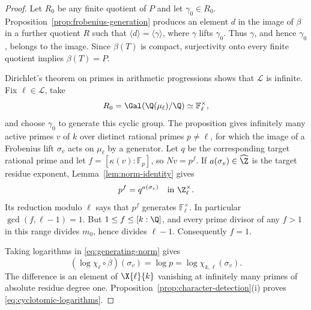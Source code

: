 \begin{proof}
Let $R_0$ be any finite quotient of $P$ and let $\gamma_0\in R_0$.
Proposition~\ref{prop:frobenius-generation} produces an element
$d$ in the image of $\beta$ in a further quotient $R$ such that
$\langle d\rangle=\langle\gamma\rangle$, where $\gamma$ lifts
$\gamma_0$. Thus $\gamma$, and hence $\gamma_0$, belongs to the
image. Since $\beta(T)$ is compact, surjectivity onto every finite
quotient implies $\beta(T)=P$.

Dirichlet's theorem on primes in arithmetic progressions shows
that $\mathcal L$ is infinite. Fix $\ell\in\mathcal L$, take
\[
 R_0=\Gal(\Q(\mu_\ell)/\Q)\simeq\mathbb F_\ell^\times,
\]
and choose $\gamma_0$ to generate this cyclic group.
The proposition gives infinitely many active primes $v$ of $k$
over distinct rational primes $p\ne\ell$, for which the image of
a Frobenius lift $\sigma_v$ acts on $\mu_\ell$ by a generator.
Let $q$ be the corresponding target rational prime and let
$f=[\kappa(v):\mathbb F_p]$, so $Nv=p^f$. If
$a(\sigma_v)\in\widehat{\Z}$ is the target residue exponent,
Lemma~\ref{lem:norm-identity} gives
\begin{equation}\label{eq:generating-norm}
  p^f=q^{a(\sigma_v)}\quad\text{in }\Z_\ell^\times.
\end{equation}
Its reduction modulo $\ell$ says that $p^f$ generates
$\mathbb F_\ell^\times$. In particular $\gcd(f,\ell-1)=1$.
But $1\leq f\leq[k:\Q]$, and every prime divisor of any $f>1$
in this range divides $m_0$, hence divides $\ell-1$.
Consequently $f=1$.

Taking logarithms in \eqref{eq:generating-norm} gives
\[
 (\log\chi_\ell\circ\beta)(\sigma_v)
   =\log p
   =\log\chi_{k,\ell}(\sigma_v).
\]
The difference is an element of $\X{\ell}{k}$ vanishing at
infinitely many primes of absolute residue degree one.
Proposition~\ref{prop:character-detection}(i) proves
\eqref{eq:cyclotomic-logarithms}.
\end{proof}
